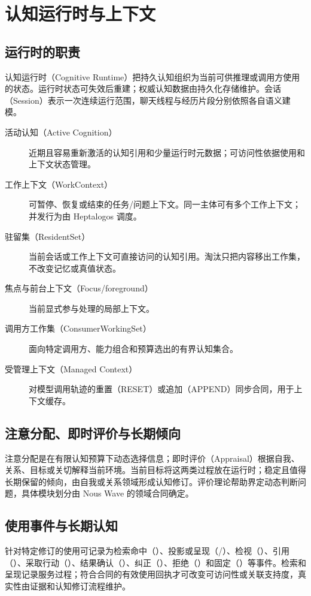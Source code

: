 \chapter{认知运行时与上下文}

\section{运行时的职责}

认知运行时（Cognitive Runtime）把持久认知组织为当前可供推理或调用方使用的状态。运行时状态可失效后重建；权威认知数据由持久化存储维护。会话（Session）表示一次连续运行范围，聊天线程与经历片段分别依照各自语义建模。\cite{nous-research-package}

\begin{description}
\item[活动认知（Active Cognition）] 近期且容易重新激活的认知引用和少量运行时元数据；可访问性依据使用和上下文状态管理。
\item[工作上下文（WorkContext）] 可暂停、恢复或结束的任务/问题上下文。同一主体可有多个工作上下文；并发行为由 Heptalogos 调度。
\item[驻留集（ResidentSet）] 当前会话或工作上下文可直接访问的认知引用。淘汰只把内容移出工作集，不改变记忆或真值状态。
\item[焦点与前台上下文（Focus/foreground）] 当前显式参与处理的局部上下文。
\item[调用方工作集（ConsumerWorkingSet）] 面向特定调用方、能力组合和预算选出的有界认知集合。
\item[受管理上下文（Managed Context）] 对模型调用轨迹的重置（RESET）或追加（APPEND）同步合同，用于上下文缓存。
\end{description}

\section{注意分配、即时评价与长期倾向}

注意分配是在有限认知预算下动态选择信息；即时评价（Appraisal）根据自我、关系、目标或关切解释当前环境。当前目标将这两类过程放在运行时；稳定且值得长期保留的倾向，由自我或关系领域形成认知修订。评价理论帮助界定动态判断问题，具体模块划分由 Nous Wave 的领域合同确定。\cite{marsella-gratch2009,nous-research-package}

\section{使用事件与长期认知}

针对特定修订的使用可记录为检索命中（\texttt{}）、投影或呈现（\texttt{}/\texttt{}）、检视（\texttt{}）、引用（\texttt{}）、采取行动（\texttt{}）、结果确认（\texttt{}）、纠正（\texttt{}）、拒绝（\texttt{}）和固定（\texttt{}）等事件。检索和呈现记录服务过程；符合合同的有效使用回执才可改变可访问性或关联支持度，真实性由证据和认知修订流程维护。\cite{nous-research-package}


